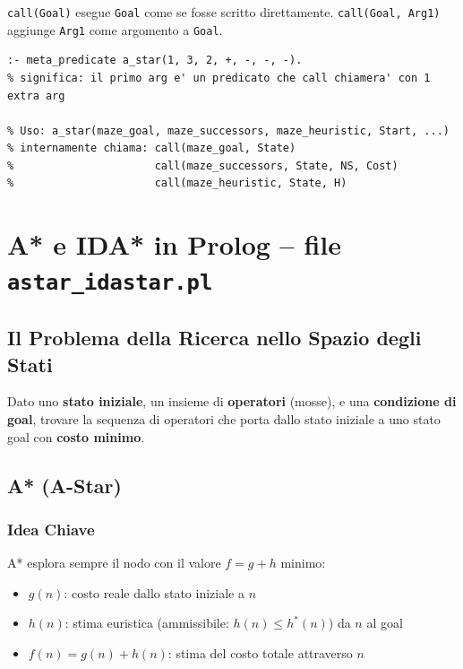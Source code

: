 \documentclass[12pt,a4paper]{article}
\begin{document}
\texttt{call(Goal)} esegue \texttt{Goal} come se fosse scritto direttamente.
\texttt{call(Goal, Arg1)} aggiunge \texttt{Arg1} come argomento a \texttt{Goal}.

\begin{lstlisting}
:- meta_predicate a_star(1, 3, 2, +, -, -, -).
% significa: il primo arg e' un predicato che call chiamera' con 1 extra arg

% Uso: a_star(maze_goal, maze_successors, maze_heuristic, Start, ...)
% internamente chiama: call(maze_goal, State)
%                      call(maze_successors, State, NS, Cost)
%                      call(maze_heuristic, State, H)
\end{lstlisting}

\section{A* e IDA* in Prolog -- file \texttt{astar\_idastar.pl}}

\subsection{Il Problema della Ricerca nello Spazio degli Stati}

Dato uno \textbf{stato iniziale}, un insieme di \textbf{operatori} (mosse),
e una \textbf{condizione di goal}, trovare la sequenza di operatori che porta
dallo stato iniziale a uno stato goal con \textbf{costo minimo}.

\subsection{A* (A-Star)}

\subsubsection{Idea Chiave}
A* esplora sempre il nodo con il valore $f = g + h$ minimo:
\begin{itemize}[noitemsep]
  \item $g(n)$: costo reale dallo stato iniziale a $n$
  \item $h(n)$: stima euristica (ammissibile: $h(n) \le h^*(n)$) da $n$ al goal
  \item $f(n) = g(n) + h(n)$: stima del costo totale attraverso $n$
\end{itemize}
\end{document}
